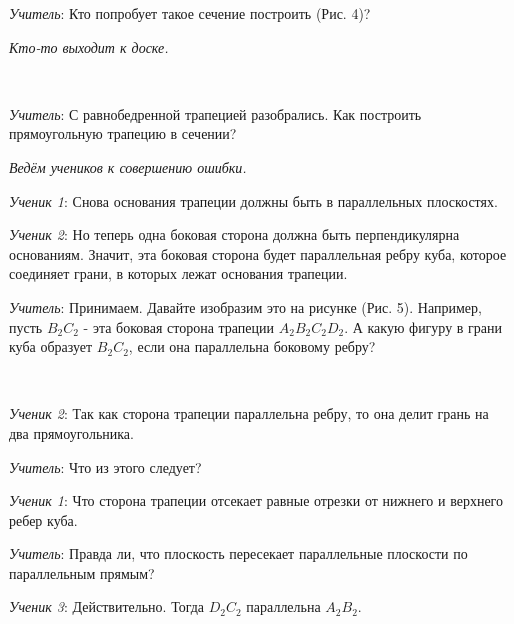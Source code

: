 \documentclass[a4paper,14pt,russian]{extreport}
\newcommand{\capt}[1]{%
    \\[8pt]
    \text{Рис. #1}
}
\begin{document}
\textit{Учитель}: Кто попробует такое сечение построить (Рис. 4)? 

\textit{Кто-то выходит к доске.}

 \begin{center}
    \begin{minipage}{0.3\textwidth}
        \centering
    \end{minipage}
    \capt{4}
\end{center}

\textit{Учитель}: С равнобедренной трапецией разобрались. Как построить прямоугольную трапецию в сечении? 

\textit{Ведём учеников к совершению ошибки.}

\textit{Ученик 1}: Снова основания трапеции должны быть в параллельных плоскостях.

\textit{Ученик 2}: Но теперь одна боковая сторона должна быть перпендикулярна основаниям. Значит, эта боковая сторона будет параллельная ребру куба, которое соединяет грани, в которых лежат основания трапеции.

\textit{Учитель}: Принимаем. Давайте изобразим это на рисунке (Рис. 5). Например, пусть $B_2C_2$ - эта боковая сторона трапеции $A_2B_2C_2D_2$. А какую фигуру в грани куба образует $B_2C_2$, если она параллельна боковому ребру?


 \begin{center}
    \begin{minipage}{0.3\textwidth}
        \centering
    \end{minipage}
    \capt{5}
\end{center}

\textit{Ученик 2}: Так как сторона трапеции параллельна ребру, то она делит грань на два прямоугольника.

\textit{Учитель}: Что из этого следует?

\textit{Ученик 1}: Что сторона трапеции отсекает равные отрезки от нижнего и верхнего ребер куба.

\textit{Учитель}: Правда ли, что плоскость пересекает параллельные плоскости по параллельным прямым?

\textit{Ученик 3}: Действительно. Тогда $D_2C_2$ параллельна $A_2B_2$.
\end{document}
